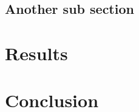 \documentclass[conference]{IEEEtran}
\begin{document}
	\subsection{Another sub section}


	\section{Results}


	\section{Conclusion}


	\nocite{*}
	\printbibliography
	
\end{document}
